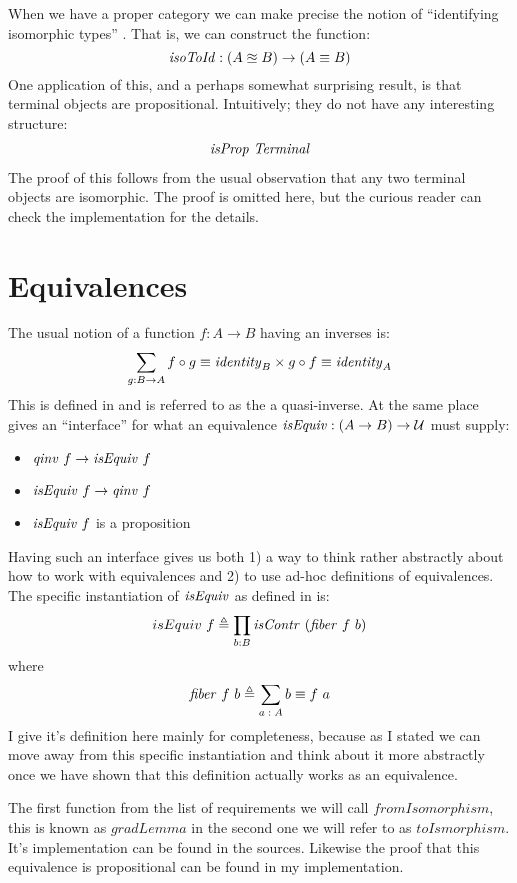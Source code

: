 When we have a proper category we can make precise the notion of ``identifying
isomorphic types'' . That is, we can construct the
function:
%
$$
\mathit{isoToId} \;\mathord{:}\; (A \approxeq B) \to (A \equiv B)
$$
%
One application of this, and a perhaps somewhat surprising result, is that
terminal objects are propositional. Intuitively; they do not
have any interesting structure:
%
\begin{align}
\label{eq:termProp}
\mathit{isProp}\ \mathit{Terminal}
\end{align}
%
The proof of this follows from the usual
observation that any two terminal objects are isomorphic. The proof is omitted
here, but the curious reader can check the implementation for the details.

\section{Equivalences}
\label{sec:equiv}
The usual notion of a function $f : A \to B$ having an inverses is:
%
$$
\sum_{g : B \to A} f \circ g \equiv \mathit{identity}_{B} \times g \circ f \equiv \mathit{identity}_{A}
$$
%
This is defined in \cite[p. 129]{hott-2013} and is referred to as the a
quasi-inverse. At the same place \cite{hott-2013} gives an ``interface'' for
what an equivalence $\mathit{isEquiv} : (A \to B) \to \mathcal{U}$ must supply:
%
\begin{itemize}
\item
  $\qinv\ f \to \isEquiv\ f$
\item
  $\isEquiv\ f \to \qinv\ f$
\item
  $\mathit{isEquiv}\ f$ is a proposition
\end{itemize}
%
Having such an interface gives us both 1) a way to think rather abstractly about
how to work with equivalences and 2) to use ad-hoc definitions of equivalences.
The specific instantiation of $\mathit{isEquiv}$ as defined in \cite{cubical-agda} is:
%
$$
isEquiv\ f \defeq \prod_{b : B} \isContr\ (\fiber\ f\ b)
$$
where
$$
\mathit{fiber}\ f\ b \triangleq \sum_{a \;\mathord{:}\; A} b \equiv f\ a
$$
%
I give it's definition here mainly for completeness, because as I stated we can
move away from this specific instantiation and think about it more abstractly
once we have shown that this definition actually works as an equivalence.

The first function from the list of requirements we will call
$\mathit{fromIsomorphism}$, this is known as $\mathit{gradLemma}$ in
\cite{cubical-agda} the second one we will refer to as $\mathit{toIsmorphism}$. It's
implementation can be found in the sources. Likewise the proof that this
equivalence is propositional can be found in my implementation.

